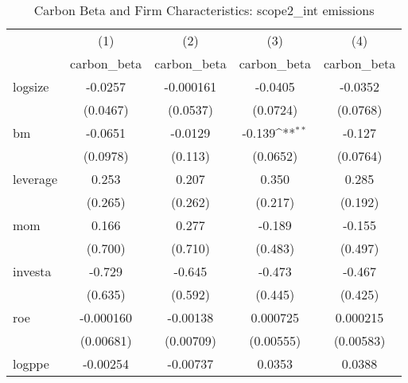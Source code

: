 \begin{table}[htbp]\centering
\def\sym#1{\ifmmode^{#1}\else\(^{#1}\)\fi}
\caption{Carbon Beta and Firm Characteristics: scope2\_int emissions}
\begin{tabular}{l*{4}{c}}
\hline\hline
                    &\multicolumn{1}{c}{(1)}&\multicolumn{1}{c}{(2)}&\multicolumn{1}{c}{(3)}&\multicolumn{1}{c}{(4)}\\
                    &\multicolumn{1}{c}{carbon\_beta}&\multicolumn{1}{c}{carbon\_beta}&\multicolumn{1}{c}{carbon\_beta}&\multicolumn{1}{c}{carbon\_beta}\\
\hline
logsize             &     -0.0257         &   -0.000161         &     -0.0405         &     -0.0352         \\
                    &    (0.0467)         &    (0.0537)         &    (0.0724)         &    (0.0768)         \\
[1em]
bm                  &     -0.0651         &     -0.0129         &      -0.139\sym{**} &      -0.127         \\
                    &    (0.0978)         &     (0.113)         &    (0.0652)         &    (0.0764)         \\
[1em]
leverage            &       0.253         &       0.207         &       0.350         &       0.285         \\
                    &     (0.265)         &     (0.262)         &     (0.217)         &     (0.192)         \\
[1em]
mom                 &       0.166         &       0.277         &      -0.189         &      -0.155         \\
                    &     (0.700)         &     (0.710)         &     (0.483)         &     (0.497)         \\
[1em]
investa             &      -0.729         &      -0.645         &      -0.473         &      -0.467         \\
                    &     (0.635)         &     (0.592)         &     (0.445)         &     (0.425)         \\
[1em]
roe                 &   -0.000160         &    -0.00138         &    0.000725         &    0.000215         \\
                    &   (0.00681)         &   (0.00709)         &   (0.00555)         &   (0.00583)         \\
[1em]
logppe              &    -0.00254         &    -0.00737         &      0.0353         &      0.0388         \\

\end{tabular}
\end{table}
